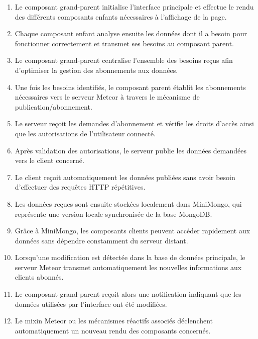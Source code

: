 \begin{enumerate}
    \item Le composant grand-parent initialise l'interface principale et effectue le rendu des différents composants enfants nécessaires à l'affichage de la page.

    \item Chaque composant enfant analyse ensuite les données dont il a besoin pour fonctionner correctement et transmet ses besoins au composant parent.

    \item Le composant grand-parent centralise l'ensemble des besoins reçus afin d'optimiser la gestion des abonnements aux données.

    \item Une fois les besoins identifiés, le composant parent établit les abonnements nécessaires vers le serveur Meteor à travers le mécanisme de publication/abonnement.

    \item Le serveur reçoit les demandes d'abonnement et vérifie les droits d'accès ainsi que les autorisations de l'utilisateur connecté.

    \item Après validation des autorisations, le serveur publie les données demandées vers le client concerné.

    \item Le client reçoit automatiquement les données publiées sans avoir besoin d'effectuer des requêtes HTTP répétitives.

    \item Les données reçues sont ensuite stockées localement dans MiniMongo, qui représente une version locale synchronisée de la base MongoDB.

    \item Grâce à MiniMongo, les composants clients peuvent accéder rapidement aux données sans dépendre constamment du serveur distant.

    \item Lorsqu'une modification est détectée dans la base de données principale, le serveur Meteor transmet automatiquement les nouvelles informations aux clients abonnés.

    \item Le composant grand-parent reçoit alors une notification indiquant que les données utilisées par l'interface ont été modifiées.

    \item Le mixin Meteor ou les mécanismes réactifs associés déclenchent automatiquement un nouveau rendu des composants concernés.


\end{enumerate}
